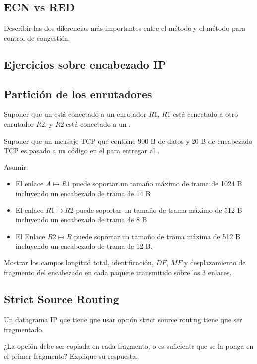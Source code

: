 \documentclass[12pt]{report}
\begin{document}
\begin{exer}
\subsection{ECN vs RED \stwo \steo}
Describir las dos diferencias más importantes entre el método  y el método  para control de congestión.
\end{exer}

\begin{exer}
\section{Ejercicios sobre encabezado IP}
\subsection{Partición de los enrutadores \sfour \shard}
Suponer que un  está conectado a un enrutador $R1$, $R1$ está conectado a otro
enrutador $R2$, y $R2$ está conectado a un .

Suponer que un mensaje TCP que contiene 900 B de datos y 20 B de encabezado TCP es pasado a un código  en el  para entregar al . 

Asumir:
\begin{itemize}
\item El enlace $A \mapsto R1$ puede soportar un tamaño máximo de trama de 1024 B incluyendo un encabezado de trama de 14 B
\item El enlace $R1 \mapsto R2$ puede soportar un tamaño de trama máximo de 512 B incluyendo un encabezado de trama de 8 B
\item El Enlace $R2 \mapsto B$ puede soportar un tamaño de trama máxima de 512 B incluyendo un encabezado de trama de 12 B.
\end{itemize}

Mostrar los campos longitud total, identificación, $DF$, $MF$ y desplazamiento de fragmento del encabezado
 en cada paquete transmitido sobre los 3 enlaces.
\end{exer}

\begin{exer}
\subsection{Strict Source Routing \stwo \steo}
Un datagrama IP que tiene que usar opción strict source routing tiene que ser
fragmentado.

¿La opción debe ser copiada en cada fragmento, o es suficiente que se la ponga en el primer fragmento? Explique su respuesta.
\end{exer}
\end{document}
